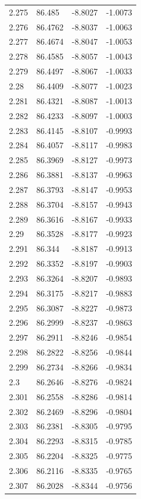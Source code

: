 \begin{tabular}{llll}
2.275 & 86.485 & -8.8027 & -1.0073 \\
2.276 & 86.4762 & -8.8037 & -1.0063 \\
2.277 & 86.4674 & -8.8047 & -1.0053 \\
2.278 & 86.4585 & -8.8057 & -1.0043 \\
2.279 & 86.4497 & -8.8067 & -1.0033 \\
2.28 & 86.4409 & -8.8077 & -1.0023 \\
2.281 & 86.4321 & -8.8087 & -1.0013 \\
2.282 & 86.4233 & -8.8097 & -1.0003 \\
2.283 & 86.4145 & -8.8107 & -0.9993 \\
2.284 & 86.4057 & -8.8117 & -0.9983 \\
2.285 & 86.3969 & -8.8127 & -0.9973 \\
2.286 & 86.3881 & -8.8137 & -0.9963 \\
2.287 & 86.3793 & -8.8147 & -0.9953 \\
2.288 & 86.3704 & -8.8157 & -0.9943 \\
2.289 & 86.3616 & -8.8167 & -0.9933 \\
2.29 & 86.3528 & -8.8177 & -0.9923 \\
2.291 & 86.344 & -8.8187 & -0.9913 \\
2.292 & 86.3352 & -8.8197 & -0.9903 \\
2.293 & 86.3264 & -8.8207 & -0.9893 \\
2.294 & 86.3175 & -8.8217 & -0.9883 \\
2.295 & 86.3087 & -8.8227 & -0.9873 \\
2.296 & 86.2999 & -8.8237 & -0.9863 \\
2.297 & 86.2911 & -8.8246 & -0.9854 \\
2.298 & 86.2822 & -8.8256 & -0.9844 \\
2.299 & 86.2734 & -8.8266 & -0.9834 \\
2.3 & 86.2646 & -8.8276 & -0.9824 \\
2.301 & 86.2558 & -8.8286 & -0.9814 \\
2.302 & 86.2469 & -8.8296 & -0.9804 \\
2.303 & 86.2381 & -8.8305 & -0.9795 \\
2.304 & 86.2293 & -8.8315 & -0.9785 \\
2.305 & 86.2204 & -8.8325 & -0.9775 \\
2.306 & 86.2116 & -8.8335 & -0.9765 \\
2.307 & 86.2028 & -8.8344 & -0.9756 \\

\end{tabular}
